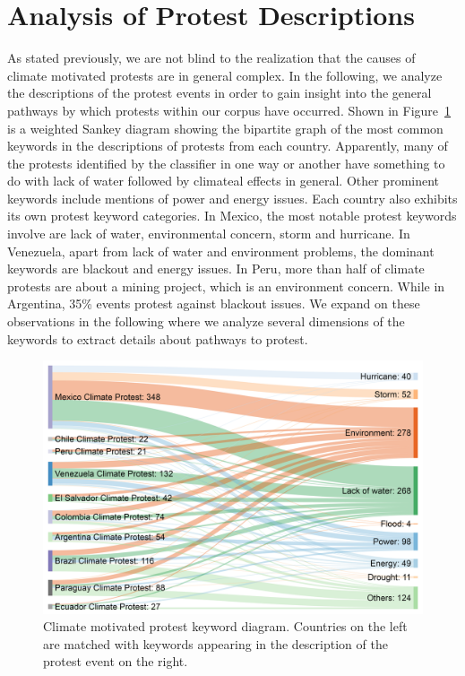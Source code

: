 \documentclass[9pt,twocolumn,twoside]{pnas-new}
\begin{document}
\section{Analysis of Protest Descriptions}
As stated previously, we are not blind to the realization that the causes of climate motivated protests are in general complex.
In the following, we analyze the descriptions of the protest events in order to gain insight into the general pathways by which protests within our corpus have occurred.
Shown in Figure~\ref{causality} is a weighted Sankey diagram showing the bipartite graph of the most common keywords in the descriptions of protests from each country.
Apparently, many of the protests identified by the classifier in one way or another have something to do with lack of water followed by climateal effects in general.
Other prominent keywords include mentions of power and energy issues.
Each country also exhibits its own protest keyword categories.
In Mexico, the most notable protest keywords involve are lack of water, environmental concern, storm and hurricane.
In Venezuela, apart from lack of water and environment problems, the dominant keywords are blackout and energy issues.
In Peru, more than half of climate protests are about a mining project, which is an environment concern.
While in Argentina, 35\% events protest against blackout issues.
We expand on these observations in the following where we analyze several dimensions of the keywords to extract details about pathways to protest.

\begin{figure}[htb]
\centerline
{\includegraphics[width=.4\textwidth]{figures/causality1}}
\caption{Climate motivated protest keyword diagram. Countries on the left are matched with keywords appearing in the description of the protest event on the right.}
\label{causality}
\end{figure}
\end{document}
